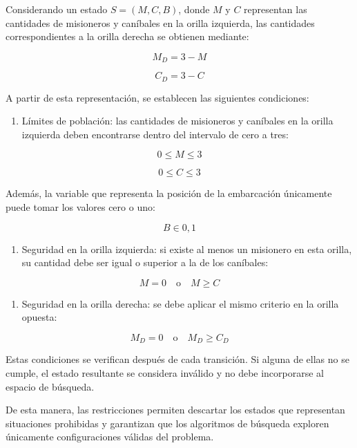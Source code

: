 \documentclass[
  spanish,
]{llncs}
\providecommand{\tightlist}{%
  \setlength{\itemsep}{0pt}\setlength{\parskip}{0pt}}
\begin{document}
Considerando un estado \(S=(M,C,B)\), donde \(M\) y \(C\) representan
las cantidades de misioneros y caníbales en la orilla izquierda, las
cantidades correspondientes a la orilla derecha se obtienen mediante:

\[
M_D=3-M
\]

\[
C_D=3-C
\]

A partir de esta representación, se establecen las siguientes
condiciones:

\begin{enumerate}
\def\labelenumi{\arabic{enumi}.}
\tightlist
\item
  Límites de población: las cantidades de misioneros y caníbales en la
  orilla izquierda deben encontrarse dentro del intervalo de cero a
  tres:
\end{enumerate}

\[
0\leq M\leq 3
\]

\[
0\leq C\leq 3
\]

Además, la variable que representa la posición de la embarcación
únicamente puede tomar los valores cero o uno:

\[
B\in{0,1}
\]

\begin{enumerate}
\def\labelenumi{\arabic{enumi}.}
\setcounter{enumi}{1}
\tightlist
\item
  Seguridad en la orilla izquierda: si existe al menos un misionero en
  esta orilla, su cantidad debe ser igual o superior a la de los
  caníbales:
\end{enumerate}

\[
M=0\quad\text{o}\quad M\geq C
\]

\begin{enumerate}
\def\labelenumi{\arabic{enumi}.}
\setcounter{enumi}{2}
\tightlist
\item
  Seguridad en la orilla derecha: se debe aplicar el mismo criterio en
  la orilla opuesta:
\end{enumerate}

\[
M_D=0\quad\text{o}\quad M_D\geq C_D
\]

Estas condiciones se verifican después de cada transición. Si alguna de
ellas no se cumple, el estado resultante se considera inválido y no debe
incorporarse al espacio de búsqueda.

De esta manera, las restricciones permiten descartar los estados que
representan situaciones prohibidas y garantizan que los algoritmos de
búsqueda exploren únicamente configuraciones válidas del problema.
\end{document}
